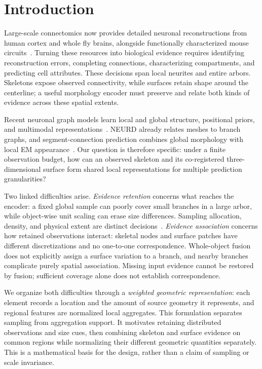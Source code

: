 \section{Introduction}
\label{sec:intro}

Large-scale connectomics now provides detailed neuronal reconstructions from human cortex and whole fly brains, alongside functionally characterized mouse circuits~\cite{shapsoncoe2024h01,dorkenwald2024flywire,microns2025functional}. Turning these resources into biological evidence requires identifying reconstruction errors, completing connections, characterizing compartments, and predicting cell attributes. These decisions span local neurites and entire arbors. Skeletons expose observed connectivity, while surfaces retain shape around the centerline; a useful morphology encoder must preserve and relate both kinds of evidence across these spatial extents.

Recent neuronal graph models learn local and global structure, positional priors, and multimodal representations~\cite{zhao2024macgnn,sheng2025sgtmorph,sheng2026neurogt,shah2026graphformer}. NEURD already relates meshes to branch graphs, and segment-connection prediction combines global morphology with local EM appearance~\cite{celii2025neurd,chen2026segmentconnectivity}. Our question is therefore specific: under a finite observation budget, how can an observed skeleton and its co-registered three-dimensional surface form shared local representations for multiple prediction granularities?

Two linked difficulties arise. \emph{Evidence retention} concerns what reaches the encoder: a fixed global sample can poorly cover small branches in a large arbor, while object-wise unit scaling can erase size differences. Sampling allocation, density, and physical extent are distinct decisions~\cite{apes2023,utonia2026}. \emph{Evidence association} concerns how retained observations interact: skeletal nodes and surface patches have different discretizations and no one-to-one correspondence. Whole-object fusion does not explicitly assign a surface variation to a branch, and nearby branches complicate purely spatial association. Missing input evidence cannot be restored by fusion; sufficient coverage alone does not establish correspondence.

We organize both difficulties through a \emph{weighted geometric representation}: each element records a location and the amount of source geometry it represents, and regional features are normalized local aggregates. This formulation separates sampling from aggregation support. It motivates retaining distributed observations and size cues, then combining skeleton and surface evidence on common regions while normalizing their different geometric quantities separately. This is a mathematical basis for the design, rather than a claim of sampling or scale invariance.

